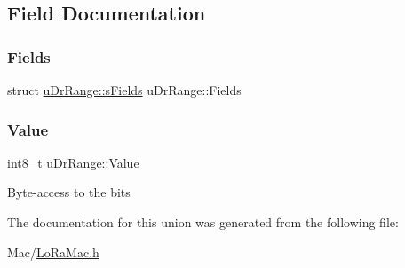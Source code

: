 \subsection{Field Documentation}
\mbox{\label{unionuDrRange_a161a7247018060f7c0991b693888fef8}} 
\subsubsection{\texorpdfstring{Fields}{Fields}}
{\footnotesize\ttfamily struct \hyperlink{structuDrRange_1_1sFields}{u\+Dr\+Range\+::s\+Fields} u\+Dr\+Range\+::\+Fields}

\mbox{\label{unionuDrRange_ae757567cbaea3fd419eb02b86d1d34db}} 
\subsubsection{\texorpdfstring{Value}{Value}}
{\footnotesize\ttfamily int8\+\_\+t u\+Dr\+Range\+::\+Value}

Byte-\/access to the bits 

The documentation for this union was generated from the following file\+:\begin{DoxyCompactItemize}
\item 
Mac/\hyperlink{LoRaMac_8h}{Lo\+Ra\+Mac.\+h}\end{DoxyCompactItemize}
